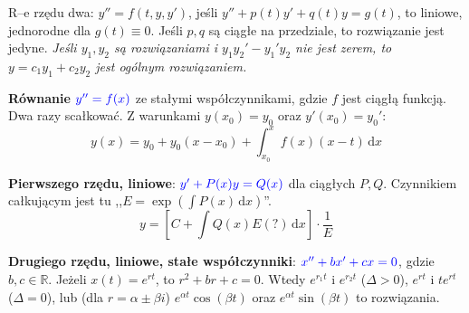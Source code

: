 \begin{multicols}{2}
R--e rzędu dwa: $y'' = f(t,y,y')$, jeśli $y'' + p(t) y' + q(t) y = g(t)$, to liniowe, jednorodne dla $g(t) \equiv 0$.
Jeśli $p, q$ są ciągłe na przedziale, to rozwiązanie jest jedyne.
\emph{Jeśli $y_1, y_2$ są rozwiązaniami i $y_1y_2'-y_1'y_2$ nie jest zerem, to $y = c_1y_1 + c_2y_2$ jest ogólnym rozwiązaniem.}


\begin{enumx}
\item \textbf{Równanie $\color{blue}y'' = f(x)$} ze stałymi współczynnikami, gdzie $f$ jest ciągłą funkcją.
Dwa razy scałkować.
Z warunkami $y(x_0) = y_0$ oraz $y'(x_0) = y_0'$:
$$
	y(x) = y_0 + y_0(x-x_0) + \int_{x_0}^x f(x)(x-t) \,\textrm{d}x
$$
\item \textbf{Pierwszego rzędu, liniowe}: $\color{blue}y' + P(x) y = Q(x)$ dla ciągłych $P, Q$.
Czynnikiem całkującym jest tu ,,$E =  \exp(\int P(x) \,\textrm{d}x)$''.
$$
y= \left[C + \int Q(x) E(?) \,\textrm{d} x\right] \cdot \frac 1 E
$$
\item \textbf{Drugiego rzędu, liniowe, stałe współczynniki}: $\color{blue}x'' + bx' + cx = 0$, gdzie $b, c \in \mathbb R$.
Jeżeli $x(t) = e^{rt}$, to $r^2 + br + c = 0$.
Wtedy $e^{r_1t}$ i $e^{r_2t}$ ($\Delta>0$),  $e^{rt}$ i $t e^{rt}$ ($\Delta = 0$), lub (dla $r = \alpha \pm \beta i$) $e^{\alpha t}\cos (\beta t)$ oraz $e^{\alpha t} \sin (\beta t)$ to rozwiązania.

\end{enumx}
\end{multicols}
